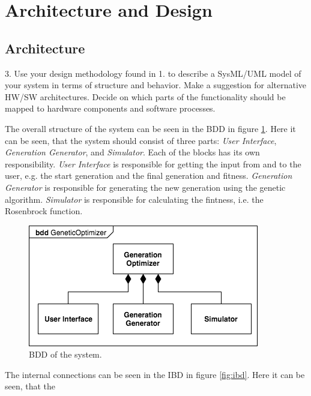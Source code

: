 \section{Architecture and Design}\label{sec:archdesign}

\subsection{Architecture}
\begin{framed}
3. Use your design methodology found in 1. to describe a SysML/UML model of your system in terms of structure and behavior. Make a suggestion for alternative HW/SW architectures. Decide on which parts of the functionality should be mapped to hardware components and software processes.
\end{framed}

The overall structure of the system can be seen in the BDD in figure \ref{fig:bdd}. Here it can be seen, that the system should consist of three parts: \emph{User Interface}, \emph{Generation Generator}, and \emph{Simulator}. Each of the blocks has its own responsibility. \emph{User Interface} is responsible for getting the input from and to the user, e.g. the start generation and the final generation and fitness. \emph{Generation Generator} is responsible for generating the new generation using the genetic algorithm. \emph{Simulator} is responsible for calculating the fintness, i.e. the Rosenbrock function.

\begin{figure}[htbp]
\begin{centering}
\includegraphics[width=0.7\linewidth]{../diagrams/bdd.png}
\caption{BDD of the system.}
\label{fig:bdd}
\end{centering}
\end{figure}

The internal connections can be seen in the IBD in figure \ref{fig:ibd}. Here it can be seen, that the 



